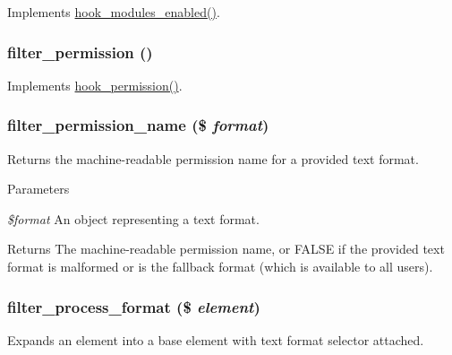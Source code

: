 \label{filter_8module_ac9fcc24aa485e1c24fa1abf036dea521}
Implements \hyperlink{group__hooks_ga0eb7c67333e0f40b4a46c0dc4c4a92f3}{hook\_\-modules\_\-enabled()}. \hypertarget{filter_8module_a58d1bbec04cb733d1107e1741627c167}{
\subsubsection[{filter\_\-permission}]{\setlength{\rightskip}{0pt plus 5cm}filter\_\-permission ()}}
\label{filter_8module_a58d1bbec04cb733d1107e1741627c167}
Implements \hyperlink{group__hooks_ga2b22b45f4925f2478412477bae329713}{hook\_\-permission()}. \hypertarget{filter_8module_a9e1efa58f39dde566c1c966740db1df0}{
\subsubsection[{filter\_\-permission\_\-name}]{\setlength{\rightskip}{0pt plus 5cm}filter\_\-permission\_\-name (\$ {\em format})}}
\label{filter_8module_a9e1efa58f39dde566c1c966740db1df0}
Returns the machine-\/readable permission name for a provided text format.


\begin{DoxyParams}{Parameters}
\item[{\em \$format}]An object representing a text format.\end{DoxyParams}
\begin{DoxyReturn}{Returns}
The machine-\/readable permission name, or FALSE if the provided text format is malformed or is the fallback format (which is available to all users). 
\end{DoxyReturn}
\hypertarget{filter_8module_a7d09545c482bcb763bd50529bc00644b}{
\subsubsection[{filter\_\-process\_\-format}]{\setlength{\rightskip}{0pt plus 5cm}filter\_\-process\_\-format (\$ {\em element})}}
\label{filter_8module_a7d09545c482bcb763bd50529bc00644b}
Expands an element into a base element with text format selector attached.

